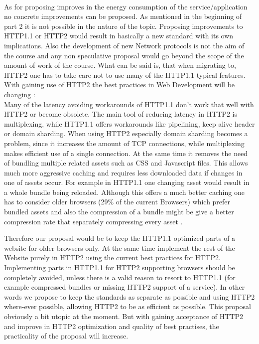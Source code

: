 \documentclass{article}
\begin{document}
\\
As for proposing improves in the energy consumption of the service/application no concrete improvements can be proposed. As mentioned in the beginning of part 2 it is not possible in the nature of the topic. Proposing improvements to HTTP1.1 or HTTP2 would result in basically a new standard with its own implications. Also the development of new Network protocols is not the aim of the course and any non speculative proposal would go beyond the scope of the amount of work of the course. What can be said is, that when migrating to, HTTP2 one has to take care not to use many of the HTTP1.1 typical features. With gaining use of HTTP2 the best practices in Web Development will be changing \citep{http2_best}:\\Many of the latency avoiding workarounds of HTTP1.1 don't work that well with HTTP2 or become obsolete. The main tool of reducing latency in HTTP2 is multiplexing, while HTTP1.1 offers workarounds like pipelining, keep alive header or domain sharding. When using HTTP2 especially domain sharding becomes a problem, since it increases the amount of TCP connections, while multiplexing makes efficient use of a single connection. At the same time it removes the need of bundling multiple related assets such as CSS and Javascript files. This allows much more aggressive caching and requires less downloaded data if changes in one of assets occur. For example in HTTP1.1 one changing asset would result in a whole bundle being reloaded. Although this offers a much better caching one has to consider older browsers (29\% of the current Browsers) which prefer bundled assets and also the compression of a bundle might be give a better compression rate that separately compressing every asset \citep{http2_best}.

Therefore our proposal would be to keep the HTTP1.1 optimized parts of a website for older browsers only. At the same time implement the rest of the Website purely in HTTP2 using the current best practices for HTTP2. Implementing parts in HTTP1.1 for HTTP2 supporting browsers should be completely avoided, unless there is a valid reason to resort to HTTP1.1 (for example compressed bundles or missing HTTP2 support of a service). In other words we propose to keep the standards as separate as possible and using HTTP2 where-ever possible, allowing HTTP2 to be as efficient as possible. This proposal obviously a bit utopic at the moment. But with gaining acceptance of HTTP2 and improve in HTTP2 optimization and quality of best practises, the practicality of the proposal will increase.
\end{document}
